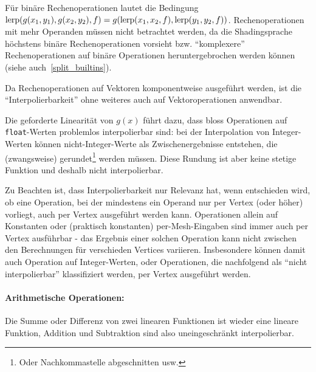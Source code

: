 \documentclass[twoside,a4paper,fleqn,12pt]{book}
\begin{document}
Für binäre Rechenoperationen lautet die Bedingung $\mathrm{lerp} (g (x_1, y_1), g (x_2, y_2), f) = g (\mathrm{lerp} (x_1, x_2, f), \mathrm{lerp} (y_1, y_2, f))$.
Rechenoperationen mit mehr Operanden müssen nicht betrachtet werden, da die Shadingsprache höchstens
binäre Rechenoperationen vorsieht bzw. "`komplexere"' Rechenoperationen auf binäre Operationen heruntergebrochen werden
können (siehe auch~\ref{split_builtins}). %

Da Rechenoperationen auf Vektoren komponentweise ausgeführt werden,  ist die "`Interpolierbarkeit"' ohne weiteres auch auf Vektoroperationen anwendbar.

Die geforderte Linearität von $g(x)$ führt dazu, dass bloss Operationen auf \texttt{float}-Werten problemlos interpolierbar sind:
bei der Interpolation von Integer-Werten können nicht-Integer-Werte als Zwischenergebnisse entstehen,
die (zwangsweise) gerundet\footnote{Oder Nachkommastelle abgeschnitten usw.} werden müssen. Diese Rundung
ist aber keine stetige Funktion und deshalb nicht interpolierbar.

Zu Beachten ist, dass Interpolierbarkeit nur Relevanz hat, wenn entschieden wird, ob eine Operation, bei der mindestens ein Operand
nur per Vertex (oder höher) vorliegt, auch per Vertex ausgeführt werden kann.
Operationen allein auf Konstanten oder (praktisch konstanten) per-Mesh-Eingaben sind immer auch per Vertex ausführbar - das Ergebnis
einer solchen Operation kann nicht zwischen den Berechnungen für verschieden Vertices variieren. Insbesondere können damit
auch Operation auf Integer-Werten, oder Operationen, die nachfolgend als "`nicht interpolierbar"' klassifiziert werden,
per Vertex ausgeführt werden.




\paragraph{Arithmetische Operationen:} Die Summe oder Differenz von zwei linearen Funktionen
ist wieder eine lineare Funktion, Addition und Subtraktion sind also uneingeschränkt interpolierbar.
\end{document}
